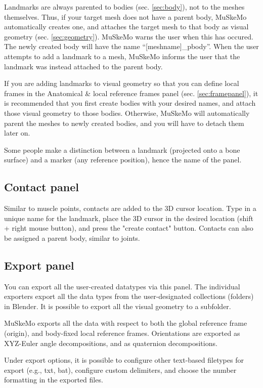 \documentclass{article}
\begin{document}
Landmarks are always parented to bodies (sec. \ref{sec:body}), not to the meshes themselves. Thus, if your target mesh does not have a parent body, MuSkeMo automatically creates one, and attaches the target mesh to that body as visual geometry (sec. \ref{sec:geometry}). MuSkeMo warns the user when this has occured. The newly created body will have the name ``[meshname]\_pbody''. When the user attempts to add a landmark to a mesh, MuSkeMo informs the user that the landmark was instead attached to the parent body.

If you are adding landmarks to visual geometry so that you can define local frames in the Anatomical \& local reference frames panel (sec. \ref{sec:framepanel}), it is recommended that you first create bodies with your desired names, and attach those visual geometry to those bodies. Otherwise, MuSkeMo will automatically parent the meshes to newly created bodies, and you will have to detach them later on.

Some people make a distinction between a landmark (projected onto a bone surface) and a marker (any reference position), hence the name of the panel.


\subsection{Contact panel}

Similar to muscle points, contacts are added to the 3D cursor location. Type in a unique name for the landmark, place the 3D cursor in the desired location (shift + right mouse button), and press the "create contact" button. Contacts can also be assigned a parent body, similar to joints.

\subsection{Export panel}
\label{sec:exportpanel}
You can export all the user-created datatypes via this panel. The individual exporters export all the data types from the user-designated collections (folders) in Blender. It is possible to export all the visual geometry to a subfolder.

MuSkeMo exports all the data with respect to both the global reference frame (origin), and body-fixed local reference frames. Orientations are exported as XYZ-Euler angle decompositions, and as quaternion decompositions.

Under export options, it is possible to configure other text-based filetypes for export (e.g., txt, bat), configure custom delimiters, and choose the number formatting in the exported files.
\end{document}
